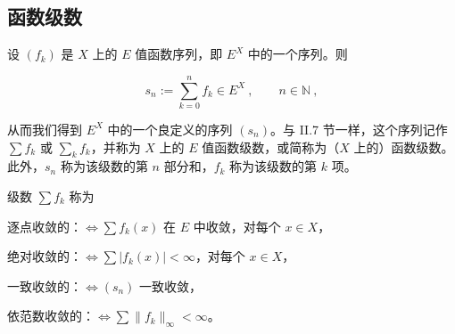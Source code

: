 \subsection*{函数级数}

设 $ (f_k) $ 是 $ X $ 上的 $ E $ 值函数序列，即 $ E^X $ 中的一个序列。则

\[
s_{n}:=\sum_{k=0}^{n}f_{k}\in E^{X}~,\qquad n\in\mathbb{N}~,
\]

从而我们得到 $ E^X $ 中的一个良定义的序列 $(s_n)$。与 II.7 节一样，这个序列记作 $\sum f_k$ 或 $\sum_k f_k$，并称为 $ X $ 上的 $ E $ 值函数级数，或简称为（$ X $ 上的）函数级数。此外，$s_n$ 称为该级数的第 $ n $ 部分和，$f_k$ 称为该级数的第 $ k $ 项。

级数 $ \sum f_k $ 称为

逐点收敛的：$ \Leftrightarrow \sum f_k(x) $ 在 $ E $ 中收敛，对每个 $ x \in X $，

绝对收敛的：$ \Leftrightarrow \sum |f_k(x)| < \infty $，对每个 $ x \in X $，

一致收敛的：$ \Leftrightarrow (s_n) $ 一致收敛，

依范数收敛的：$ \Leftrightarrow \sum \| f_k \|_\infty < \infty $。

